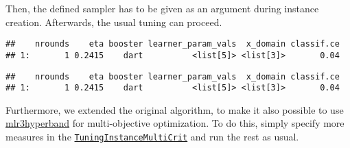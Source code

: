 \documentclass[
]{scrbook}
\newenvironment{Shaded}{\begin{snugshade}}{\end{snugshade}}
\newcommand{\AttributeTok}[1]{\textcolor[rgb]{0.77,0.63,0.00}{#1}}
\newcommand{\CommentTok}[1]{\textcolor[rgb]{0.56,0.35,0.01}{\textit{#1}}}
\newcommand{\DecValTok}[1]{\textcolor[rgb]{0.00,0.00,0.81}{#1}}
\newcommand{\FunctionTok}[1]{\textcolor[rgb]{0.00,0.00,0.00}{#1}}
\newcommand{\NormalTok}[1]{#1}
\newcommand{\OtherTok}[1]{\textcolor[rgb]{0.56,0.35,0.01}{#1}}
\newcommand{\SpecialCharTok}[1]{\textcolor[rgb]{0.00,0.00,0.00}{#1}}
\newcommand{\StringTok}[1]{\textcolor[rgb]{0.31,0.60,0.02}{#1}}
\renewenvironment{Shaded} {\begin{snugshade}\small} {\end{snugshade}}
\begin{document}
Then, the defined sampler has to be given as an argument during instance creation.
Afterwards, the usual tuning can proceed.

\begin{Shaded}
\end{Shaded}

\begin{verbatim}
##    nrounds    eta booster learner_param_vals  x_domain classif.ce
## 1:       1 0.2415    dart          <list[5]> <list[3]>       0.04
\end{verbatim}

\begin{Shaded}
\end{Shaded}

\begin{verbatim}
##    nrounds    eta booster learner_param_vals  x_domain classif.ce
## 1:       1 0.2415    dart          <list[5]> <list[3]>       0.04
\end{verbatim}

Furthermore, we extended the original algorithm, to make it also possible to use \href{https://mlr3hyperband.mlr-org.com}{mlr3hyperband} for multi-objective optimization.
To do this, simply specify more measures in the \href{https://mlr3tuning.mlr-org.com/reference/TuningInstanceMultiCrit.html}{\texttt{TuningInstanceMultiCrit}} and run the rest as usual.

\begin{Shaded}
\end{Shaded}
\end{document}
